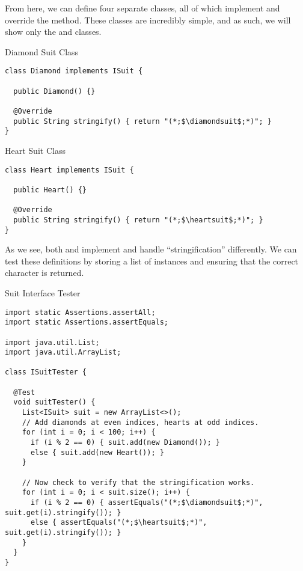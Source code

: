 From here, we can define four separate classes, all of which implement  and override the  method. These classes are incredibly simple, and as such, we will show only the  and  classes.

\begin{cl}[]{Diamond Suit Class}
\begin{lstlisting}[language=MyJava]
class Diamond implements ISuit {
  
  public Diamond() {}

  @Override
  public String stringify() { return "(*;$\diamondsuit$;*)"; }
}
\end{lstlisting}
\end{cl}

\begin{cl}[]{Heart Suit Class}
\begin{lstlisting}[language=MyJava]
class Heart implements ISuit {
    
  public Heart() {}

  @Override
  public String stringify() { return "(*;$\heartsuit$;*)"; }
}
\end{lstlisting}
\end{cl}

As we see, both  and  implement  and handle ``stringification'' differently. We can test these definitions by storing a list of  instances and ensuring that the correct character is returned.

\begin{cl}[]{Suit Interface Tester}
\begin{lstlisting}[language=MyJava]
import static Assertions.assertAll;
import static Assertions.assertEquals;

import java.util.List;
import java.util.ArrayList;

class ISuitTester {

  @Test
  void suitTester() {
    List<ISuit> suit = new ArrayList<>();
    // Add diamonds at even indices, hearts at odd indices.
    for (int i = 0; i < 100; i++) {
      if (i % 2 == 0) { suit.add(new Diamond()); }
      else { suit.add(new Heart()); }
    }

    // Now check to verify that the stringification works.
    for (int i = 0; i < suit.size(); i++) {
      if (i % 2 == 0) { assertEquals("(*;$\diamondsuit$;*)", suit.get(i).stringify()); }
      else { assertEquals("(*;$\heartsuit$;*)", suit.get(i).stringify()); }
    }
  }
}
\end{lstlisting}
\end{cl}

